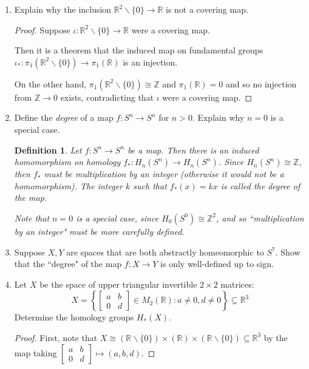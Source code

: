 \documentclass{article}
\newtheorem*{definition}{Definition}
\begin{document}
\begin{enumerate}
	\item Explain why the inclusion $\mathbb{R}^2 \backslash \{0\} \rightarrow \mathbb{R}$ is not a covering map.
	
	\begin{proof}
		Suppose $\iota : \mathbb{R}^2 \backslash \{ 0 \} \rightarrow \mathbb{R}$ were a covering map. 
		
		Then it is a theorem that the induced map on fundamental groups $\iota_*: \pi_1(\mathbb{R}^2 \backslash \{ 0 \}) \rightarrow \pi_1(\mathbb{R})$ is an injection. 
		
		On the other hand, $\pi_1 (\mathbb{R}^2 \backslash \{ 0 \}) \cong \mathbb{Z}$ and $\pi_1( \mathbb{R} ) = 0$ and so no injection from $\mathbb{Z} \rightarrow 0$ exists, contradicting that $\iota$ were a covering map.
	\end{proof} 
	
	\item Define the \textit{degree} of a map $f: S^n \rightarrow S^n$ for $n > 0$. Explain why $n=0$ is a special case.
	
	\begin{definition}
		Let $f: S^n \rightarrow S^n$ be a map. Then there is an induced homomorphism on homology $f_* : H_n (S^n) \rightarrow H_n (S^n)$. Since $H_n(S^n) \cong \mathbb{Z}$, then $f_*$ must be multiplication by an integer (otherwise it would not be a homomorphism). The integer $k$ such that $f_*(x) = kx$ is called the degree of the map.
		
		Note that $n=0$ is a special case, since $H_0(S^0) \cong \mathbb{Z}^2$, and so ``multiplication by an integer" must be more carefully defined.
	\end{definition}
	
	\item Suppose $X, Y$ are spaces that are both abstractly homeomorphic to $S^7$. Show that the ``degree" of the map $f: X \rightarrow Y$ is only well-defined up to sign.
	
	\item Let $X$ be the space of upper triangular invertible $2\times 2$ matrices:
	\[X = \left \{ \begin{bmatrix} a & b \\ 0 & d \end{bmatrix} \in M_2 (\mathbb{R}) : a \neq 0, d \neq 0\right \} \subseteq \mathbb{R}^3\]
	 Determine the homology groups $H_*(X)$. 

	
	\begin{proof}
		First, note that $X \cong (\mathbb{R} \backslash \{0\}) \times (\mathbb{R}) \times (\mathbb{R} \backslash \{0\})\subseteq \mathbb{R}^3$ by the map taking $\begin{bmatrix} a & b \\ 0 & d \end{bmatrix} \mapsto (a,b,d)$.
		

\end{proof}
\end{enumerate}
\end{document}

